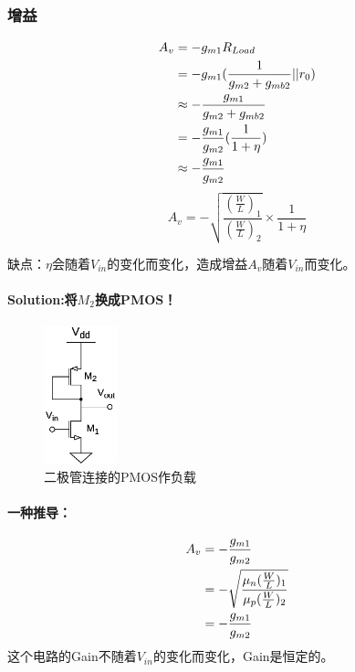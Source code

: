 \documentclass[twoside,a4paper,openright,titlepage,draft]{ctexrep}
\begin{document}
\subsubsection{增益}
\begin{align}
    A_v &= -g_{m1}R_{Load} \notag \\
    &= -g_{m1}(\frac{1}{g_{m2} + g_{mb2}} || r_0) \notag \\
    &\approx -\frac{g_{m1}}{g_{m2} + g_{mb2}} \notag \\
    &= -\frac{g_{m1}}{g_{m2}}(\frac{1}{1 + \eta}) \notag \\
    &\approx -\frac{g_{m1}}{g_{m2}}
\end{align}
\begin{equation}
    A_v = - \sqrt{\frac{(\frac{W}{L})_1}{(\frac{W}{L})_2}}\times \frac{1}{1 + \eta}
\end{equation} \par
缺点：$\eta$会随着$V_{in}$的变化而变化，造成增益$A_v$随着$V_{in}$而变化。
\paragraph{Solution:将$M_2$换成PMOS！}

\begin{multicols}{2}
    \begin{figure}[H]
        \centering
        \includegraphics[height=40mm]{diode-connectedpmos.eps}
        \caption{二极管连接的PMOS作负载}
        \label{fig:共源二极管连接的PMOS负载}
    \end{figure}
    \columnbreak
    \paragraph{一种推导：}
    \begin{align}
        A_v &= -\frac{g_{m1}}{g_{m2}} \notag \\
        &= -\sqrt{\frac{\mu_n (\frac{W}{L})_1}{\mu_p (\frac{W}{L})_2}} \notag \\
        &= -\frac{g_{m1}}{g_{m2}}
    \end{align}
    这个电路的Gain不随着$V_{in}$的变化而变化，Gain是恒定的。\\
\end{multicols}
\end{document}
